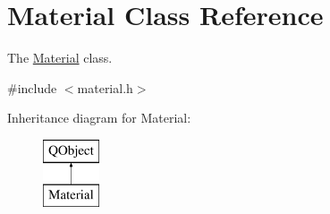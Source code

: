 \hypertarget{class_material}{}\section{Material Class Reference}
\label{class_material}


The \hyperlink{class_material}{Material} class.  




{\ttfamily \#include $<$material.\+h$>$}

Inheritance diagram for Material\+:\begin{figure}[H]
\begin{center}
\leavevmode
\includegraphics[height=2.000000cm]{class_material}
\end{center}
\end{figure}
